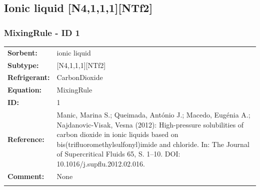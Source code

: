 \subsection{Ionic liquid [N4,1,1,1][NTf2]}
%
\subsubsection{MixingRule - ID 1}
%
\begin{tabular}[l]{|lp{11.5cm}|}
\hline
\addlinespace

\textbf{Sorbent:} & ionic liquid \\
\textbf{Subtype:} & [N4,1,1,1][NTf2] \\
\textbf{Refrigerant:} & CarbonDioxide \\
\textbf{Equation:} & MixingRule \\
\textbf{ID:} & 1 \\
\textbf{Reference:} & Manic, Marina S.; Queimada, António J.; Macedo, Eugénia A.; Najdanovic-Visak, Vesna (2012): High-pressure solubilities of carbon dioxide in ionic liquids based on bis(trifluoromethylsulfonyl)imide and chloride. In: The Journal of Supercritical Fluids 65, S. 1–10. DOI: 10.1016/j.supflu.2012.02.016. \\
\textbf{Comment:} & None \\

\addlinespace
\hline
\end{tabular}
\newline

